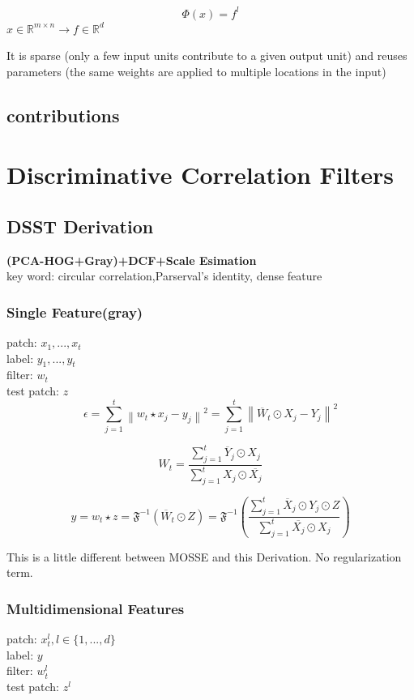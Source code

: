 \documentclass[11pt]{article}
\begin{document}
$$ \Phi(x)=f^{l} $$
$x \in \mathbb{R}^{m \times n} \longrightarrow f \in \mathbb{R}^{d}$

It is sparse (only a few input units contribute to a given output unit) and reuses parameters (the same weights are applied to multiple locations in the input)

\subsection{contributions}

\section{Discriminative Correlation Filters}
  \subsection{DSST Derivation}
  \textbf{(PCA-HOG+Gray)+DCF+Scale Esimation}\\
  key word: circular correlation,Parserval's identity, dense feature
    \subsubsection{Single Feature(gray)}
    patch: $x_1,...,x_t$	\\
    label: $y_1,...,y_t$	\\
    filter: $w_t$	\\
    test patch: $z$	\\

$$
\epsilon =  \sum_{j=1}^{t}\left \| w_{t}\star x_{j}-y_{j} \right \|^{2} = \sum_{j=1}^{t}\left \| \overline{W}_{t} \odot X_{j}-Y_{j} \right \|^{2}
$$


$$
W_{t}=\frac{\sum_{j=1}^{t}\overline{Y}_{j} \odot X_{j}}{\sum_{j=1}^{t}X_{j} \odot\overline{ X_{j}}} 
$$

$$
y=w_t \star z = \mathfrak{F}^{-1} \left( {\overline{W}_{t} \odot Z}\right)
 = \mathfrak{F}^{-1} \left(\frac{\sum_{j=1}^{t}\overline{X}_{j} \odot Y_{j} \odot Z}{\sum_{j=1}^{t}\overline{X_{j}} \odot X_{j}} \right)
$$

This is a little different between MOSSE\cite{MOSSE} and this Derivation. No regularization term.

\subsubsection{Multidimensional Features}

patch: $  x_t^l ,l\in \{ 1,...,d \} $ \\
label: $ y $ \\
filter: $ w_t^l $ \\
test patch: $ z^l $ \\
\end{document}
